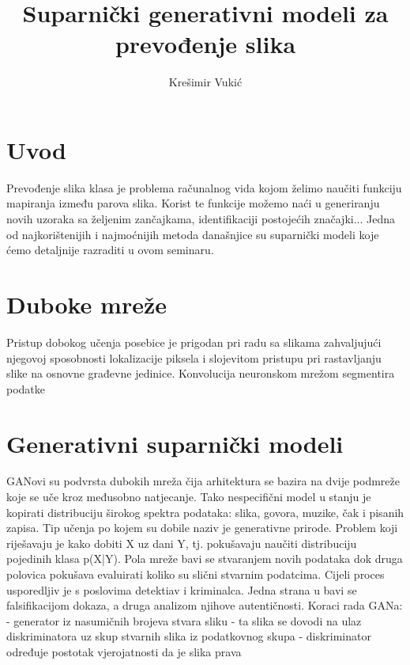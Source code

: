 \documentclass[lmodern, utf8, seminar]{fer}
\begin{document}
\nocite{*}



\title{Suparnički generativni modeli za prevođenje slika}

\author{Krešimir Vukić}

\maketitle


\tableofcontents



\chapter{Uvod}
Prevođenje slika klasa je problema računalnog vida kojom želimo naučiti funkciju mapiranja između parova slika. Korist te funkcije možemo naći u generiranju novih uzoraka sa željenim zančajkama, identifikaciji postojećih značajki... Jedna od najkorištenijih i najmoćnijih metoda današnjice su suparnički modeli koje ćemo detaljnije razraditi u ovom seminaru.



\chapter{Duboke mreže}
Pristup dobokog učenja posebice je prigodan pri radu sa slikama zahvaljujući njegovoj sposobnosti lokalizacije piksela i slojevitom pristupu pri rastavljanju slike na osnovne građevne jedinice.
\newline
Konvolucija neuronskom mrežom segmentira podatke 



\chapter{Generativni suparnički modeli}
GANovi su podvrsta dubokih mreža čija arhitektura se bazira na dvije podmreže koje se uče kroz međusobno natjecanje. Tako nespecifični model u stanju je kopirati distribuciju širokog spektra podataka: slika, govora, muzike, čak i pisanih zapisa.
\newline
Tip učenja po kojem su dobile naziv je generativne prirode. Problem koji riješavaju je kako dobiti X uz dani Y, tj. pokušavaju naučiti distribuciju pojedinih klasa p(X|Y).
\newline
Pola mreže bavi se stvaranjem novih podataka dok druga polovica pokušava evaluirati koliko su slični stvarnim podatcima.
Cijeli proces usporedljiv je s poslovima detektiav i kriminalca. Jedna strana u bavi se falsifikacijom dokaza, a druga analizom njihove autentičnosti.
\newline
Koraci rada GANa:
 - generator iz nasumičnih brojeva stvara sliku
 - ta slika se dovodi na ulaz diskriminatora uz skup stvarnih slika iz podatkovnog skupa
 - diskriminator određuje postotak vjerojatnosti da je slika prava
\end{document}
